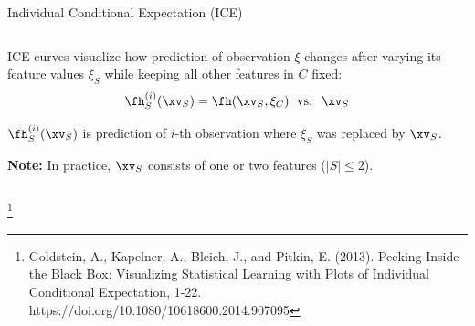 \documentclass[11pt,compress,t,notes=noshow, aspectratio=169, xcolor=table]{beamer}
\begin{document}
\begin{frame}{Individual Conditional Expectation (ICE)}
\begin{columns}[T]
\begin{column}{0.82\textwidth}
ICE curves visualize how prediction of observation $\xi$ changes after varying its feature values $\xi_S$ while keeping all other features in $C$ fixed:
$$\fh_{S}^{(i)}(\xv_S) = \fh(\xv_S, \xi_C) \; \text{ vs. } \; \xv_S$$

$\fh_{S}^{(i)}(\xv_S)$ is prediction of $i$-th observation where $\xi_S$ was replaced by $\xv_S$.

\textbf{Note:} In practice, $\xv_S$ consists of one or two features ($|S| \leq 2$).

\end{column}
\end{columns}



%
\footnote[frame]{Goldstein, A., Kapelner, A., Bleich, J., and Pitkin, E. (2013). Peeking Inside the Black Box: Visualizing Statistical Learning with Plots of Individual Conditional Expectation, 1-22. https://doi.org/10.1080/10618600.2014.907095}
\end{frame}
\end{document}
